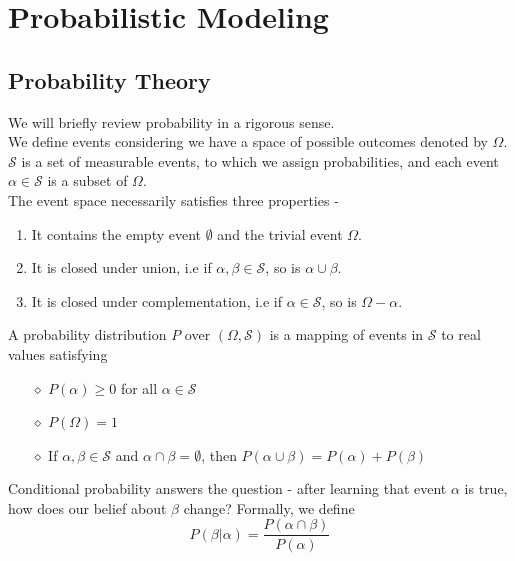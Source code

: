 \section{Probabilistic Modeling}
\subsection{Probability Theory}
We will briefly review probability in a rigorous sense. \\We define events considering we have a space of possible outcomes denoted by $\Omega$. $\mathcal S$ is a set of measurable events, to which we assign probabilities, and each event $\alpha \in \mathcal S$ is a subset of $\Omega$. \\
The event space necessarily satisfies three properties - 
\begin{enumerate}
	\item It contains the empty event $\emptyset$ and the trivial event $\Omega$.
	\item It is closed under union, i.e if $\alpha, \beta \in \mathcal S$, so is $\alpha \cup \beta$.
	\item It is closed under complementation, i.e if $\alpha \in \mathcal S$, so is $\Omega - \alpha$. 
\end{enumerate}
\begin{defn}\label{defn:prob}
A probability distribution $P$ over $(\Omega, \mathcal S)$ is a mapping of events in $\mathcal S$ to real values satisfying 
\begin{itemize}[leftmargin=1cm]
	\item[$\diamond$] $P(\alpha) \geq 0$ for all $\alpha \in \mathcal S$
	\item[$\diamond$] $P(\Omega) = 1$
	\item[$\diamond$] If $\alpha, \beta \in \mathcal S$ and $\alpha \cap \beta = \emptyset$, then $P(\alpha \cup \beta) = P(\alpha) + P(\beta)$
\end{itemize}
\end{defn}
Conditional probability answers the question - after learning that event $\alpha$ is true, how does our belief about $\beta$ change? Formally, we define
\begin{equation}
	P(\beta|\alpha) = \dfrac{P(\alpha \cap \beta)}{P(\alpha)}
\end{equation}
